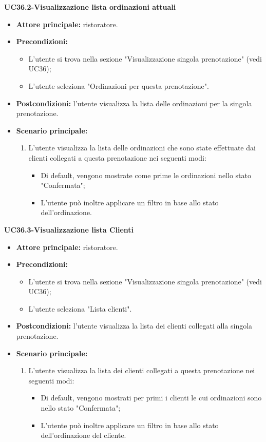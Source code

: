 \textbf{UC36.2-Visualizzazione lista ordinazioni attuali}
\begin{itemize}
    \item \textbf{Attore principale:} ristoratore.
    \item \textbf{Precondizioni:} 
    \begin{itemize}
        \item L'utente si trova nella sezione "Visualizzazione singola prenotazione" (vedi UC36);
        \item L'utente seleziona "Ordinazioni per questa prenotazione".
    \end{itemize}
    \item \textbf{Postcondizioni:} l'utente visualizza la lista delle ordinazioni per la singola prenotazione.
    \item \textbf{Scenario principale:}
    \begin{enumerate}
        \item L'utente visualizza la lista delle ordinazioni che sono state effettuate dai clienti collegati a questa prenotazione nei seguenti modi:
        \begin{itemize}
            \item Di default, vengono mostrate come prime le ordinazioni nello stato "Confermata";
            \item L'utente può inoltre applicare un filtro in base allo stato dell'ordinazione.
        \end{itemize}
    \end{enumerate}
\end{itemize}

\textbf{UC36.3-Visualizzazione lista Clienti}  %
\begin{itemize}
    \item \textbf{Attore principale:} ristoratore.
    \item \textbf{Precondizioni:} 
    \begin{itemize}
        \item L'utente si trova nella sezione "Visualizzazione singola prenotazione" (vedi UC36);
        \item L'utente seleziona "Lista clienti".
    \end{itemize}
    \item \textbf{Postcondizioni:} l'utente visualizza la lista dei clienti collegati alla singola prenotazione.
    \item \textbf{Scenario principale:}
    \begin{enumerate}
        \item L'utente visualizza la lista dei clienti collegati a questa prenotazione nei seguenti modi:
        \begin{itemize}
            \item Di default, vengono mostrati per primi i clienti le cui ordinazioni sono nello stato "Confermata";
            \item L'utente può inoltre applicare un filtro in base allo stato dell'ordinazione del cliente.
        \end{itemize}
    \end{enumerate}
\end{itemize}



